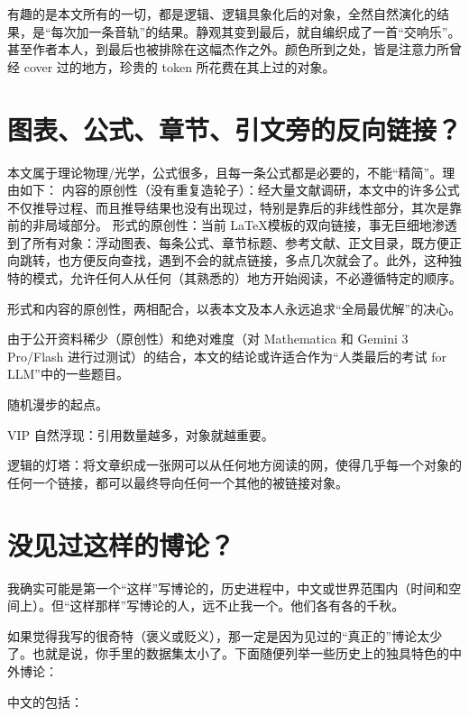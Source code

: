 有趣的是本文所有的一切，都是逻辑、逻辑具象化后的对象，全然自然演化的结果，是“每次加一条音轨”的结果。静观其变到最后，就自编织成了一首“交响乐”。甚至作者本人，到最后也被排除在这幅杰作之外。颜色所到之处，皆是注意力所曾经 cover 过的地方，珍贵的 token 所花费在其上过的对象。

\section{图表、公式、章节、引文旁的反向链接？}\label{sec:t}

本文属于理论物理/光学，公式很多，且每一条公式都是必要的，不能“精简”。理由如下：{\one} 内容的原创性（没有重复造轮子）：经大量文献调研，本文中的许多公式不仅推导过程、而且推导结果也没有出现过，特别是靠后的非线性部分，其次是靠前的非局域部分。{\two} 形式的原创性：当前 \LaTeX 模板的双向链接，事无巨细地渗透到了所有对象：浮动图表、每条公式、章节标题、参考文献、正文目录，既方便正向跳转，也方便反向查找，遇到不会的就点链接，多点几次就会了。此外，这种独特的模式，允许任何人从任何（其熟悉的）地方开始阅读，不必遵循特定的顺序。

形式和内容的原创性，两相配合，以表本文及本人永远追求“全局最优解”的决心。

由于公开资料稀少（原创性）和绝对难度（对 Mathematica 和 Gemini 3 Pro/Flash 进行过测试）的结合，本文的结论或许适合作为“人类最后的考试 for LLM”中的一些题目。

{\one} 随机漫步的起点。

{\two} VIP 自然浮现：引用数量越多，对象就越重要。

{\three} 逻辑的灯塔：将文章织成一张网可以从任何地方阅读的网，使得几乎每一个对象的任何一个链接，都可以最终导向任何一个其他的被链接对象。

\section{没见过这样的博论？}\label{sec:}

我确实可能是第一个“这样”写博论的，历史进程中，中文或世界范围内（时间和空间上）。但“这样那样”写博论的人，远不止我一个。他们各有各的千秋。

如果觉得我写的很奇特（褒义或贬义），那一定是因为见过的“真正的”博论太少了。也就是说，你手里的数据集太小了。下面随便列举一些历史上的独具特色的中外博论：

{\one} 中文的包括：

